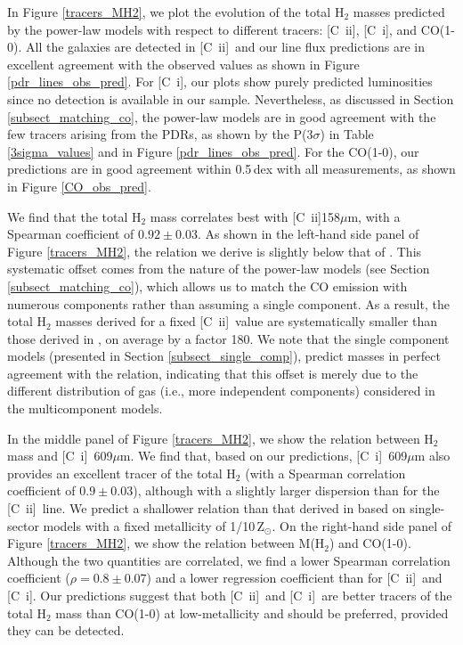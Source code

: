 \documentclass{aa}
\newcommand{\ci}{[C~{\sc i}]}
\newcommand{\cii}{[C~{\sc ii}]}
\begin{document}
In Figure \ref{tracers_MH2}, we plot the evolution of the total H$_2$ masses predicted by the power-law models with respect to different tracers: \cii, \ci, and CO(1-0). All the galaxies are detected in \cii\ and our line flux predictions are in excellent agreement with the observed values as shown in Figure \ref{pdr_lines_obs_pred}. For \ci, our plots show purely predicted luminosities since no detection is available in our sample. Nevertheless, as discussed in Section \ref{subsect_matching_co}, the power-law models are in good agreement with the few tracers arising from the PDRs, as shown by the P(3$\sigma$) in Table \ref{3sigma_values} and in Figure \ref{pdr_lines_obs_pred}. For the CO(1-0), our predictions are in good agreement within 0.5\,dex with all measurements, as shown in Figure \ref{CO_obs_pred}.

We find that the total H$_2$ mass correlates best with \cii 158$\mu$m, with a Spearman coefficient of $0.92 \pm 0.03$. As shown in the left-hand side panel of  Figure \ref{tracers_MH2}, the relation we derive is slightly below that of . This systematic offset comes from the nature of the power-law models (see Section \ref{subsect_matching_co}), which allows us to match the CO emission with numerous components rather than assuming a single component. As a result, the total H$_2$ masses derived for a fixed \cii\ value are systematically smaller than those derived in , on average by a factor 180. 
We note that the single component models (presented in Section \ref{subsect_single_comp}), predict masses in perfect agreement with the  relation, indicating that this offset is merely due to the different distribution of gas (i.e., more independent components)  considered in the multicomponent models. 

In the middle panel of Figure \ref{tracers_MH2}, we show the relation between H$_2$ mass and \ci\ 609$\mu$m. We find that, based on our predictions, \ci\ 609$\mu$m also provides an excellent tracer of the total H$_2$ (with a Spearman correlation coefficient of $0.9 \pm 0.03$), although with a slightly larger dispersion than for the \cii\ line. We predict a shallower relation than that derived in  based on single-sector models with a fixed metallicity of 1/10\,Z$_{\odot}$. 
On the right-hand side panel of Figure \ref{tracers_MH2}, we show the relation between M(H$_2$) and CO(1-0). Although the two quantities are correlated, we find a lower Spearman correlation coefficient ($\rho=0.8 \pm 0.07$) and a lower regression coefficient than for \cii\  and \ci. Our predictions suggest that both \cii\ and \ci\ are better tracers of the total H$_2$ mass than CO(1-0) at low-metallicity and should be preferred, provided they can be detected.
\end{document}
